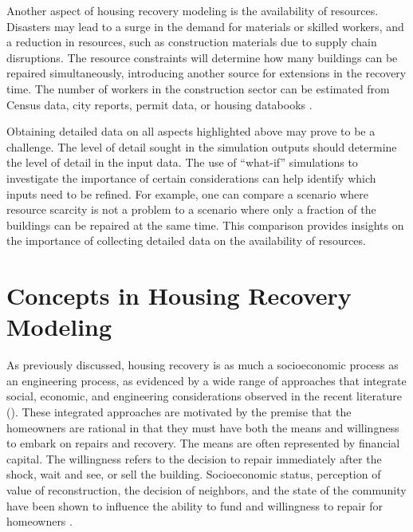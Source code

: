 Another aspect of housing recovery modeling is the availability of resources. Disasters may lead to a surge in the demand for materials or skilled workers, and a reduction in resources, such as construction materials due to supply chain disruptions. The resource constraints will determine how many buildings can be repaired simultaneously, introducing another source for extensions in the recovery time. The number of workers in the construction sector can be estimated from Census data, city reports, permit data, or housing databooks \citep{kang2018replicating, costa2020housing}. \

Obtaining detailed data on all aspects highlighted above may prove to be a challenge. The level of detail sought in the simulation outputs should determine the level of detail in the input data. The use of ``what-if'' simulations to investigate the importance of certain considerations can help identify which inputs need to be refined. For example, one can compare a scenario where resource scarcity is not a problem to a scenario where only a fraction of the buildings can be repaired at the same time. This comparison provides insights on the importance of collecting detailed data on the availability of resources.\ 

\section{Concepts in Housing Recovery Modeling} 
As previously discussed, housing recovery is as much a socioeconomic process as an engineering process, as evidenced by a wide range of approaches that integrate social, economic, and engineering considerations observed in the recent literature (\cite{nejat2020spatially, moradi2020recovus, costa2020housing, bilau2018practice, hamideh2018housing, Burton2018, DESaster}). These integrated approaches are motivated by the premise that the homeowners are rational in that they must have both the means and willingness to embark on repairs and recovery. The means are often represented by financial capital. The willingness refers to the decision to repair immediately after the shock, wait and see, or sell the building. Socioeconomic status, perception of value of reconstruction, the decision of neighbors, and the state of the community have been shown to influence the ability to fund and willingness to repair for homeowners \citep{Burton2018, moradi2020recovus, nejat2012agent, comerio2006estimating, chang2011identifying, boiser2011skills, bilau2015framework, hwang2015postdisaster, bothara2016challenges}. \ 

